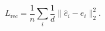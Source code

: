 \begin{equation}
L_{\mathrm{rec}}=\frac1n\sum_i\frac1d\|\hat e_i-e_i\|_2^2.\tag{12}\label{eq:original-12}
\end{equation}
